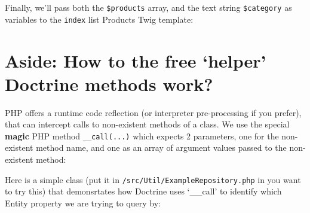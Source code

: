 \documentclass[a4paperpaper,openright]{book}
\newenvironment{Shaded}{}{}
\newcommand{\FunctionTok}[1]{\textcolor[rgb]{0.02,0.16,0.49}{#1}}
\newcommand{\KeywordTok}[1]{\textcolor[rgb]{0.00,0.44,0.13}{\textbf{#1}}}
\newcommand{\NormalTok}[1]{#1}
\newcommand{\OtherTok}[1]{\textcolor[rgb]{0.00,0.44,0.13}{#1}}
\newcommand{\StringTok}[1]{\textcolor[rgb]{0.25,0.44,0.63}{#1}}
\begin{document}
Finally, we'll pass both the \texttt{\$products} array, and the text
string \texttt{\$category} as variables to the \texttt{index} list
Products Twig template:

\begin{Shaded}
\end{Shaded}

\hypertarget{aside-how-to-the-free-helper-doctrine-methods-work}{%
\section{Aside: How to the free `helper' Doctrine methods
work?}\label{aside-how-to-the-free-helper-doctrine-methods-work}}

PHP offers a runtime code reflection (or interpreter pre-processing if
you prefer), that can intercept calls to non-existent methods of a
class. We use the special \textbf{magic} PHP method
\texttt{\_\_call(...)} which expects 2 parameters, one for the
non-existent method name, and one as an array of argument values passed
to the non-existent method:

\begin{Shaded}
\end{Shaded}

Here is a simple class (put it in
\texttt{/src/Util/ExampleRepository.php} in you want to try this) that
demonsrtates how Doctrine uses `\_\_call' to identify which Entity
property we are trying to query by:
\end{document}
